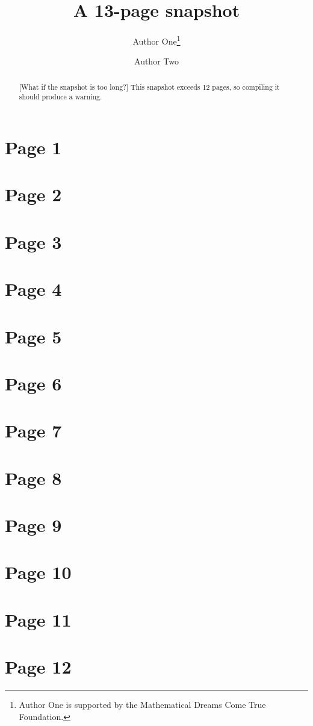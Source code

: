 \documentclass{snapshotmfo}
\author{Author One\thanks{Author One is supported by the Mathematical Dreams Come True Foundation.} \and Author Two}
\title{A 13-page snapshot}
\begin{document}

\begin{abstract}[What if the snapshot is too long?]
    This snapshot exceeds 12 pages, so compiling it should produce a 
    warning.
\end{abstract}

\section{Page 1}

\newpage\section{Page 2}
\newpage\section{Page 3}
\newpage\section{Page 4}
\newpage\section{Page 5}
\newpage\section{Page 6}
\newpage\section{Page 7}
\newpage\section{Page 8}
\newpage\section{Page 9}
\newpage\section{Page 10}
\newpage\section{Page 11}
\newpage\section{Page 12}
\end{document}
